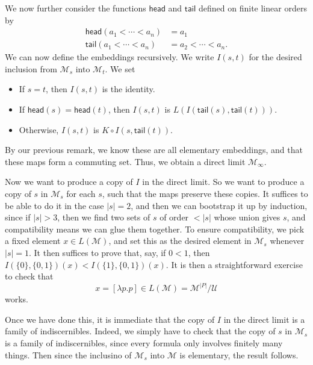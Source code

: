 \documentclass[a4paper]{article}
\newcommand\last{\mathsf{last}}
\newcommand\butlast{\mathsf{butlast}}
\newcommand\head{\mathsf{head}}
\newcommand\tail{\mathsf{tail}}
\begin{document}
We now further consider the functions $\head$ and $\tail$ defined on finite linear orders by
\begin{align*}
  \head(a_1 < \cdots < a_n) &= a_1\\
  \tail(a_1 < \cdots < a_n) &= a_2 < \cdots < a_n.
\end{align*}
We can now define the embeddings recursively. We write $I(s, t)$ for the desired inclusion from $\mathcal{M}_s$ into $\mathcal{M}_t$. We set
\begin{itemize}
  \item If $s = t$, then $I(s, t)$ is the identity.
  \item If $\head(s) = \head(t)$, then $I(s, t)$ is $L(I(\tail(s), \tail(t)))$.
  \item Otherwise, $I(s, t)$ is $K \circ I(s, \tail(t))$.
\end{itemize}
By our previous remark, we know these are all elementary embeddings, and that these maps form a commuting set. Thus, we obtain a direct limit $\mathcal{M}_\infty$.

Now we want to produce a copy of $I$ in the direct limit. So we want to produce a copy of $s$ in $\mathcal{M}_s$ for each $s$, such that the maps preserve these copies. It suffices to be able to do it in the case $|s| = 2$, and then we can bootstrap it up by induction, since if $|s| > 3$, then we find two sets of $s$ of order $< |s|$ whose union gives $s$, and compatibility means we can glue them together. To ensure compatibility, we pick a fixed element $x \in L(\mathcal{M})$, and set this as the desired element in $\mathcal{M}_s$ whenever $|s| = 1$. It then suffices to prove that, say, if $0 < 1$, then $I(\{0\}, \{0, 1\})(x) < I(\{1\}, \{0, 1\})(x)$. It is then a straightforward exercise to check that
\[
  x = [\lambda p. p] \in L(\mathcal{M}) = \mathcal{M}^{|P|}/\mathcal{U}
\]
works.

Once we have done this, it is immediate that the copy of $I$ in the direct limit is a family of indiscernibles. Indeed, we simply have to check that the copy of $s$ in $\mathcal{M}_s$ is a family of indiscernibles, since every formula only involves finitely many things. Then since the inclusino of $\mathcal{M}_s$ into $\mathcal{M}$ is elementary, the result follows.
\end{document}

